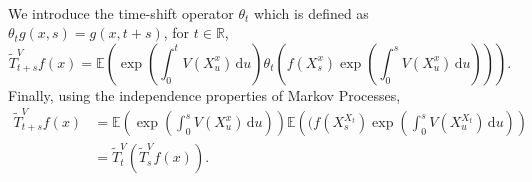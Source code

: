\documentclass[a4paper,12pt,draft]{report}
\begin{document}
{\begin{align}
\end{align}
We introduce the time-shift operator $\theta_t$ which is defined as $\theta_tg(x, s) = g(x, t + s)$, for $t \in \mathbb{R}$,
$$
\tilde{T}_{t + s}^Vf(x) = \mathbb{E}\left(\exp\left(\int_0^t V(X_u^x)\,\mathrm{d}u\right)\theta_t\left(f(X_s^x)\exp\left(\int_0^s V(X_u^x)\,\mathrm{d}u\right)\right)\right).
$$
Finally, using the independence properties of Markov Processes,
\begin{align}
\tilde{T}_{t + s}^Vf(x) & = \mathbb{E}\left(\exp\left(\int_0^s V(X_u^x)\,\mathrm{d}u\right)\right)\mathbb{E}\left((f(X_s^{X_t})\exp\left(\int_0^s V(X_u^{X_t})\,\mathrm{d}u\right)\right)\nonumber\\
& = \tilde{T}_t^V(\tilde{T}_s^Vf(x)).\nonumber
\end{align}

\qedhere
}
\end{document}
